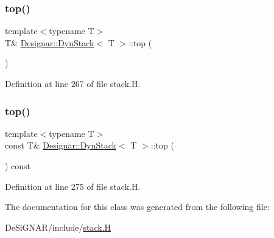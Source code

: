 \subsubsection{\texorpdfstring{top()}{top()}\hspace{0.1cm}{\footnotesize\ttfamily [1/2]}}
{\footnotesize\ttfamily template$<$typename T$>$ \\
T\& \hyperlink{class_designar_1_1_dyn_stack}{Designar\+::\+Dyn\+Stack}$<$ T $>$\+::top (\begin{DoxyParamCaption}{ }\end{DoxyParamCaption})\hspace{0.3cm}{\ttfamily [inline]}}



Definition at line 267 of file stack.\+H.

\mbox{\label{class_designar_1_1_dyn_stack_a497eb06d2cb8280d031586a913b1317c}} 
\subsubsection{\texorpdfstring{top()}{top()}\hspace{0.1cm}{\footnotesize\ttfamily [2/2]}}
{\footnotesize\ttfamily template$<$typename T$>$ \\
const T\& \hyperlink{class_designar_1_1_dyn_stack}{Designar\+::\+Dyn\+Stack}$<$ T $>$\+::top (\begin{DoxyParamCaption}{ }\end{DoxyParamCaption}) const\hspace{0.3cm}{\ttfamily [inline]}}



Definition at line 275 of file stack.\+H.



The documentation for this class was generated from the following file\+:\begin{DoxyCompactItemize}
\item 
De\+Si\+G\+N\+A\+R/include/\hyperlink{stack_8_h}{stack.\+H}\end{DoxyCompactItemize}
